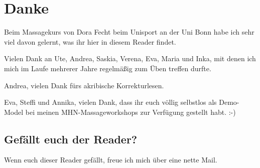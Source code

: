 \section*{Danke}

Beim Massagekurs von Dora Fecht beim Unisport an der Uni Bonn habe ich sehr viel davon gelernt, was ihr hier in diesem Reader findet.

Vielen Dank an Ute, Andrea, Saskia, Verena, Eva, Maria und Inka, mit denen ich mich im Laufe mehrerer Jahre regelmäßig zum Üben treffen durfte.

Andrea, vielen Dank fürs akribische Korrekturlesen.

Eva, Steffi und Annika, vielen Dank, dass ihr euch völlig selbstlos als Demo-Model bei meinen MHN-Massageworkshops zur Verfügung gestellt habt. :-)

\subsection*{Gefällt euch der Reader?}

Wenn euch dieser Reader gefällt, freue ich mich über eine nette Mail.
